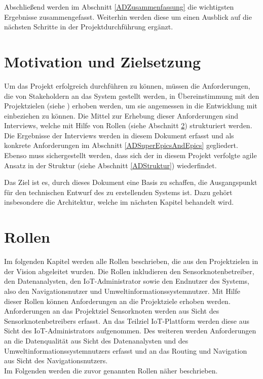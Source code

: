 Abschließend werden im Abschnitt \ref{ADZusammenfassung} die wichtigsten Ergebnisse zusammengefasst. Weiterhin werden diese um einen Ausblick auf die nächsten Schritte in der Projektdurchführung ergänzt.

\section{Motivation und Zielsetzung}\label{ADMotivationZielsetzung}
Um das Projekt erfolgreich durchführen zu können, müssen die Anforderungen, die von Stakeholdern an das System gestellt werden, in Übereinstimmung mit den Projektzielen (siehe ) erhoben werden, um sie angemessen in die Entwicklung mit einbeziehen zu können. Die Mittel zur Erhebung dieser Anforderungen sind Interviews, welche mit Hilfe von Rollen (siehe Abschnitt \ref{ADRollen}) strukturiert werden. Die Ergebnisse der  Interviews werden in diesem Dokument erfasst und als konkrete Anforderungen im Abschnitt \ref{ADSuperEpicsAndEpics} gegliedert. Ebenso muss sichergestellt werden, dass sich der in diesem Projekt verfolgte agile Ansatz in der Struktur (siehe Abschnitt \ref{ADStruktur}) wiederfindet.

Das Ziel ist es, durch dieses Dokument eine Basis zu schaffen, die Ausgangspunkt für den technischen Entwurf des zu erstellenden Systems ist. Dazu gehört insbesondere die Architektur, welche im nächsten Kapitel behandelt wird. 


\section{Rollen}\label{ADRollen}
Im folgenden Kapitel werden alle Rollen beschrieben, die aus den Projektzielen in der Vision abgeleitet wurden. Die Rollen inkludieren den Sensorknotenbetreiber, den Datenanalysten, den IoT-Administrator sowie den Endnutzer des Systems, also den Navigationsnutzer und Umweltinformationssystemnutzer. Mit Hilfe dieser Rollen können Anforderungen an die Projektziele  erhoben werden. Anforderungen an das Projektziel Sensorknoten werden aus Sicht des Sensorknotenbetreibers erfasst. An das Teilziel IoT-Plattform werden diese aus Sicht des IoT-Administrators aufgenommen. Des weiteren werden Anforderungen an die Datenqualität aus Sicht des Datenanalysten und des Umweltinformationssystemnutzers erfasst und an das Routing und Navigation aus Sicht des Navigationsnutzers. \\
Im Folgenden werden die zuvor genannten Rollen näher beschrieben.

